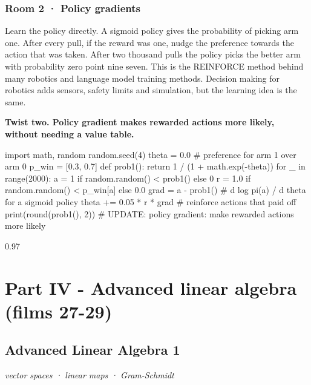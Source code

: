 \documentclass[11pt,a4paper]{report}
\begin{document}
\section*{Room 2 · Policy gradients}
Learn the policy directly. A sigmoid policy gives the probability of picking arm one. After every pull, if the reward was one, nudge the preference towards the action that was taken. After two thousand pulls the policy picks the better arm with probability zero point nine seven. This is the REINFORCE method behind many robotics and language model training methods. Decision making for robotics adds sensors, safety limits and simulation, but the learning idea is the same.
\begin{tcolorbox}[colback=yellow!12,colframe=orange!70!black,boxrule=0.4pt,left=4pt,right=4pt,top=2pt,bottom=2pt]\textbf{Twist two. Policy gradient makes rewarded actions more likely, without needing a value table.}\end{tcolorbox}
\begin{Code}
import math, random
random.seed(4)
theta = 0.0                                 # preference for arm 1 over arm 0
p_win = [0.3, 0.7]
def prob1(): return 1 / (1 + math.exp(-theta))
for _ in range(2000):
    a = 1 if random.random() < prob1() else 0
    r = 1.0 if random.random() < p_win[a] else 0.0
    grad = a - prob1()                      # d log pi(a) / d theta for a sigmoid policy
    theta += 0.05 * r * grad                # reinforce actions that paid off
print(round(prob1(), 2))
# UPDATE: policy gradient: make rewarded actions more likely
\end{Code}
\begin{Out}
0.97
\end{Out}
\part*{Part IV - Advanced linear algebra (films 27-29)}
\chapter{Advanced Linear Algebra 1}
\textit{vector spaces · linear maps · Gram-Schmidt}
\end{document}
